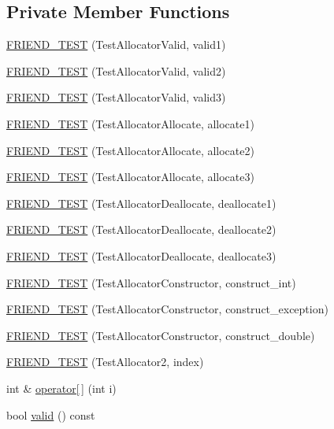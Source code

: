 \subsection*{Private Member Functions}
\begin{DoxyCompactItemize}
\item 
\hyperlink{classAllocator_a90b542896a12519c57ff48f0a1291c9e}{F\-R\-I\-E\-N\-D\-\_\-\-T\-E\-S\-T} (Test\-Allocator\-Valid, valid1)
\item 
\hyperlink{classAllocator_acec28ca417b8b946021f18228d22bb87}{F\-R\-I\-E\-N\-D\-\_\-\-T\-E\-S\-T} (Test\-Allocator\-Valid, valid2)
\item 
\hyperlink{classAllocator_a3fd9ba1b92c874cc6fa6503c5d3b4bce}{F\-R\-I\-E\-N\-D\-\_\-\-T\-E\-S\-T} (Test\-Allocator\-Valid, valid3)
\item 
\hyperlink{classAllocator_a5d8aa32f38104b88ef58647a227266b2}{F\-R\-I\-E\-N\-D\-\_\-\-T\-E\-S\-T} (Test\-Allocator\-Allocate, allocate1)
\item 
\hyperlink{classAllocator_ade09a76b974fd01d33b91e595c825f1f}{F\-R\-I\-E\-N\-D\-\_\-\-T\-E\-S\-T} (Test\-Allocator\-Allocate, allocate2)
\item 
\hyperlink{classAllocator_a93dbf33652db4593a80a05eb69ff1ed3}{F\-R\-I\-E\-N\-D\-\_\-\-T\-E\-S\-T} (Test\-Allocator\-Allocate, allocate3)
\item 
\hyperlink{classAllocator_adefad2b824e680717c7c5bdd742a06ae}{F\-R\-I\-E\-N\-D\-\_\-\-T\-E\-S\-T} (Test\-Allocator\-Deallocate, deallocate1)
\item 
\hyperlink{classAllocator_a896dab9fc43bd2baed0f4caba2fc7765}{F\-R\-I\-E\-N\-D\-\_\-\-T\-E\-S\-T} (Test\-Allocator\-Deallocate, deallocate2)
\item 
\hyperlink{classAllocator_a6ffad5be55856c6b143314bc004de63c}{F\-R\-I\-E\-N\-D\-\_\-\-T\-E\-S\-T} (Test\-Allocator\-Deallocate, deallocate3)
\item 
\hyperlink{classAllocator_a1df2f9e7022ad5a23b23548ad720927f}{F\-R\-I\-E\-N\-D\-\_\-\-T\-E\-S\-T} (Test\-Allocator\-Constructor, construct\-\_\-int)
\item 
\hyperlink{classAllocator_a3326fa9a413a093541e2169ce0ddb18f}{F\-R\-I\-E\-N\-D\-\_\-\-T\-E\-S\-T} (Test\-Allocator\-Constructor, construct\-\_\-exception)
\item 
\hyperlink{classAllocator_aa16d8dc2877fc7e5e00f3781081c8d5f}{F\-R\-I\-E\-N\-D\-\_\-\-T\-E\-S\-T} (Test\-Allocator\-Constructor, construct\-\_\-double)
\item 
\hyperlink{classAllocator_a47a944e121d002ee031c535f8d0131dc}{F\-R\-I\-E\-N\-D\-\_\-\-T\-E\-S\-T} (Test\-Allocator2, index)
\item 
int \& \hyperlink{classAllocator_ae57d6a9fc29cb1c1e61f58f90f7f3123}{operator\mbox{[}$\,$\mbox{]}} (int i)
\item 
bool \hyperlink{classAllocator_a45091854a38a5abf184cc442d2af4022}{valid} () const 
\end{DoxyCompactItemize}
